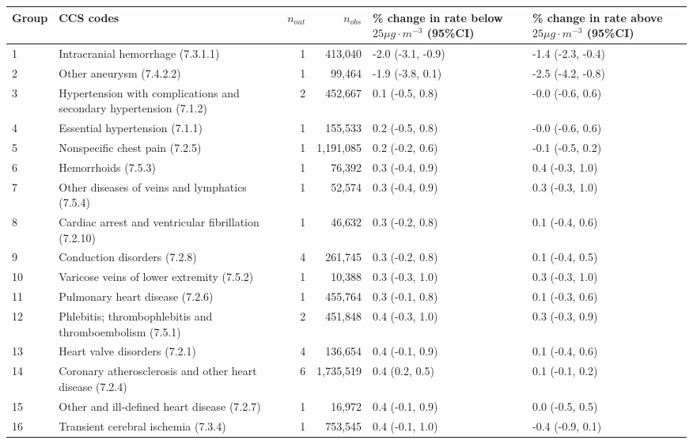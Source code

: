 \begin{tabular}{lp{6.5cm}rrp{2.2cm}p{2.2cm}}
  \hline
Group & CCS codes & $n_{out}$ & $n_{obs}$ & \% change in rate below $25 \mu g \cdot m^{-3}$ (95\%CI) & \% change in rate above $25 \mu g \cdot m^{-3}$ (95\%CI) \\ 
  \hline
 1 & Intracranial hemorrhage (7.3.1.1) &  1 & 413,040 & -2.0 (-3.1, -0.9) & -1.4 (-2.3, -0.4) \\ 
   2 & Other aneurysm (7.4.2.2) &  1 & 99,464 & -1.9 (-3.8, 0.1) & -2.5 (-4.2, -0.8) \\ 
   3 & Hypertension with complications and secondary hypertension (7.1.2) &  2 & 452,667 & 0.1 (-0.5, 0.8) & -0.0 (-0.6, 0.6) \\ 
   4 & Essential hypertension (7.1.1) &  1 & 155,533 & 0.2 (-0.5, 0.8) & -0.0 (-0.6, 0.6) \\ 
   5 & Nonspecific chest pain (7.2.5) &  1 & 1,191,085 & 0.2 (-0.2, 0.6) & -0.1 (-0.5, 0.2) \\ 
   6 & Hemorrhoids (7.5.3) &  1 & 76,392 & 0.3 (-0.4, 0.9) & 0.4 (-0.3, 1.0) \\ 
   7 & Other diseases of veins and lymphatics (7.5.4) &  1 & 52,574 & 0.3 (-0.4, 0.9) & 0.3 (-0.3, 1.0) \\ 
   8 & Cardiac arrest and ventricular fibrillation (7.2.10) &  1 & 46,632 & 0.3 (-0.2, 0.8) & 0.1 (-0.4, 0.6) \\ 
   9 & Conduction disorders (7.2.8) &  4 & 261,745 & 0.3 (-0.2, 0.8) & 0.1 (-0.4, 0.5) \\ 
  10 & Varicose veins of lower extremity (7.5.2) &  1 & 10,388 & 0.3 (-0.3, 1.0) & 0.3 (-0.3, 1.0) \\ 
  11 & Pulmonary heart disease (7.2.6) &  1 & 455,764 & 0.3 (-0.1, 0.8) & 0.1 (-0.3, 0.6) \\ 
  12 & Phlebitis; thrombophlebitis and thromboembolism (7.5.1) &  2 & 451,848 & 0.4 (-0.3, 1.0) & 0.3 (-0.3, 0.9) \\ 
  13 & Heart valve disorders (7.2.1) &  4 & 136,654 & 0.4 (-0.1, 0.9) & 0.1 (-0.4, 0.6) \\ 
  14 & Coronary atherosclerosis and other heart disease (7.2.4) &  6 & 1,735,519 & 0.4 (0.2, 0.5) & 0.1 (-0.1, 0.2) \\ 
  15 & Other and ill-defined heart disease (7.2.7) &  1 & 16,972 & 0.4 (-0.1, 0.9) & 0.0 (-0.5, 0.5) \\ 
  16 & Transient cerebral ischemia (7.3.4) &  1 & 753,545 & 0.4 (-0.1, 1.0) & -0.4 (-0.9, 0.1) \\ 

\end{tabular}
